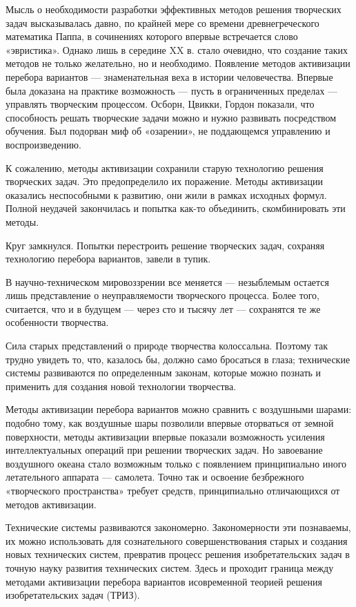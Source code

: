 Мысль   о  необходимости   разработки   эффективных  методов   решения
творческих  задач  высказывалась давно,  по  крайней  мере со  времени
древнегреческого  математика  Паппа,  в  сочинениях  которого  впервые
встречается  слово «эвристика».  Однако лишь  в середине  XX в.  стало
очевидно,  что  создание  таких   методов  не  только  желательно,  но
и  необходимо.  Появление  методов активизации  перебора  вариантов  —
знаменательная веха  в истории человечества. Впервые  была доказана на
практике  возможность  — пусть  в  ограниченных  пределах —  управлять
творческим процессом. Осборн, Цвикки, Гордон показали, что способность
решать творческие задачи можно и нужно развивать посредством обучения.
Был  подорван   миф  об   «озарении»,  не  поддающемся   управлению  и
воспроизведению.

К сожалению,  методы активизации  сохранили старую  технологию решения
творческих задач. Это предопределило  их поражение. Методы активизации
оказались  неспособными  к  развитию,   они  жили  в  рамках  исходных
формул.  Полной  неудачей  закончилась и  попытка  как-то  объединить,
скомбинировать эти методы.

Круг замкнулся. Попытки перестроить решение творческих задач, сохраняя
технологию перебора вариантов, завели в тупик.


В научно-техническом мировоззрении все  меняется — незыблемым остается
лишь представление о неуправляемости творческого процесса. Более того,
считается, что и в будущем — через сто и тысячу лет — сохранятся те же
особенности творчества.

Сила старых  представлений о  природе творчества  колоссальна. Поэтому
так  трудно  увидеть  то,  что, казалось  бы,  должно  само  бросаться
в  глаза; технические  системы  развиваются  по определенным  законам,
которые  можно  познать  и  применить для  создания  новой  технологии
творчества.


Методы  активизации перебора  вариантов  можно  сравнить с  воздушными
шарами: подобно тому, как  воздушные шары позволили впервые оторваться
от земной поверхности, методы активизации впервые показали возможность
усиления интеллектуальных  операций при  решении творческих  задач. Но
завоевание  воздушного  океана  стало возможным  только  с  появлением
принципиально  иного  летательного  аппарата  —  самолета.  Точно  так
и  освоение безбрежного  «творческого  пространства» требует  средств,
принципиально отличающихся от методов активизации.

Технические  системы   развиваются  закономерно.   Закономерности  эти
познаваемы, их можно  использовать для сознательного совершенствования
старых и создания новых  технических систем, превратив процесс решения
изобретательских  задач в  точную науку  развития технических  систем.
Здесь и проходит граница между методами активизации перебора вариантов
исовременной теорией решения изобретательских задач (ТРИЗ).


